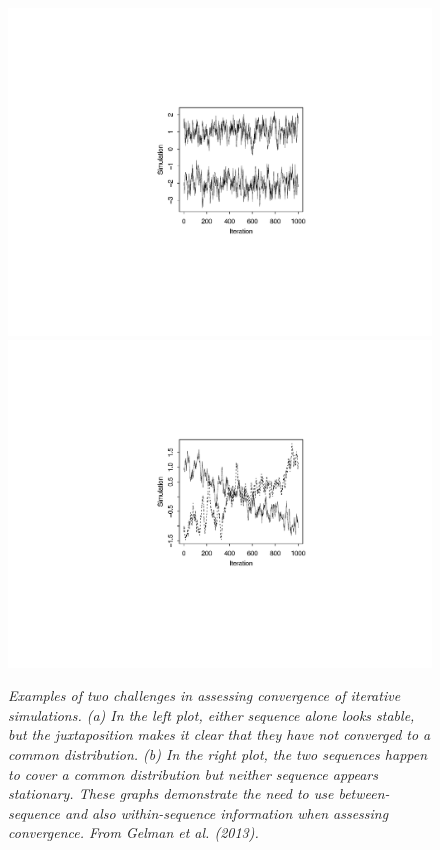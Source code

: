 \documentclass[american,]{article}
\begin{document}
\begin{figure}
\vspace{-.22\textwidth}
\centerline{\hspace{-.1\textwidth}
\includegraphics[width=\textwidth]{graphics/convergechallenge1.pdf}
\hspace{-.5\textwidth}
\includegraphics[width=\textwidth]{graphics/convergechallenge2.pdf}}
\vspace{-.22\textwidth}
\caption{\em Examples of two challenges in assessing convergence of iterative
simulations. (a) In the left plot, either sequence alone looks stable, but the
juxtaposition makes it clear that they have not converged to a common
distribution. (b) In the right plot, the two sequences happen to cover a common
distribution but neither sequence appears stationary. These graphs demonstrate
the need to use between-sequence and also within-sequence information when
assessing convergence. From Gelman et al. (2013).}
\label{converge.challenge}
\end{figure}
\end{document}
